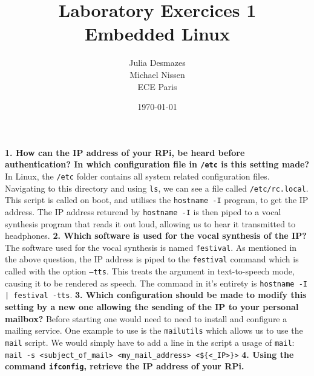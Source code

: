 \documentclass[a4paper,oneside,onecolumn]{article}
\newcommand{\code}[1]{\colorbox{codegray}{\texttt{#1}}}
\begin{document}
\title{Laboratory Exercices 1 \\ Embedded Linux}
\author{Julia Desmazes \\ Michael Nissen \\ ECE Paris}
\date{\today}
\maketitle
\bigskip

\noindent
\textbf{1. How can the IP address of your RPi, be heard before authentication? In which configuration file in \texttt{/etc} is this setting made?}
\newline
\newline
In Linux, the \texttt{/etc} folder contains all system related configuration files. Navigating to this directory and using \code{ls}, we can see a file called \texttt{/etc/rc.local}. This script is called on boot, and utilises the \code{hostname -I} program, to get the IP address. The IP address returend by \code{hostname -I} is then piped to a vocal synthesis program that reads it out loud, allowing us to hear it transmitted to headphones.
\newline
\newline
\noindent
\textbf{2. Which software is used for the vocal synthesis of the IP?}
\newline
\newline
The software used for the vocal synthesis is named \texttt{festival}. As mentioned in the above question, the IP address is piped to the \texttt{festival} command which is called with the option \code{--tts}. This treats the argument in text-to-speech mode, causing it to be rendered as speech. The command in it's entirety is \code{hostname -I | festival -tts}.
\newline
\newline
\noindent
\textbf{3. Which configuration should be made to modify this setting by a new one allowing the sending of the IP to your personal mailbox?}
\newline
\newline
Before starting one would need to need to install and configure a mailing service. One example to use is the \texttt{mailutils} which allows us to use the \code{mail} script. We would simply have to add a line in the script a usage of \code{mail}:
\code{mail -s <subject\_of\_mail> <my\_mail\_address> <\$\{<\_IP>\}>}
\newline
\newline
\noindent
\textbf{4. Using the command \code{ifconfig}, retrieve the IP address of your RPi.}
\end{document}
